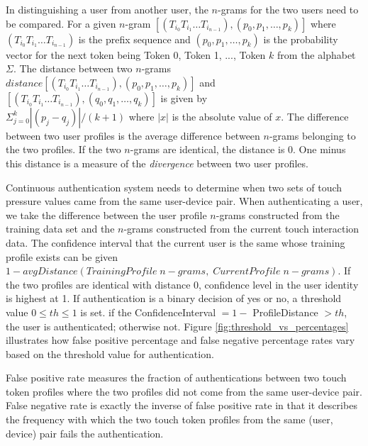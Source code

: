 \documentclass{acm_proc_article-sp}
\begin{document}
In distinguishing a user from another user, the $n$-grams for the two users need to be compared. 
For a given $n$-gram $[(T_{i_0} T_{i_1} \dots T_{i_{n-1}}), (p_0, p_1, \dots, p_k)]$ where 
$(T_{i_0} T_{i_1} \dots T_{i_{n-1}})$ is the prefix sequence and $(p_0, p_1, \dots, p_k)$ is the
probability vector for the next token being Token 0, Token 1, ..., Token $k$ from the alphabet $\Sigma$.
The distance between two $n$-grams $distance[(T_{i_0} T_{i_1} \dots T_{i_{n-1}}), (p_0, p_1, \dots, p_k)]$
and \\
$[(T_{i_0} T_{i_1} \dots T_{i_{n-1}}), (q_0, q_1, \dots, q_k)]$ is
given by \\
$\Sigma_{j=0}^k|(p_j - q_j)|/(k+1)$ where $|x|$ is the absolute value of $x$.
The difference between two user profiles is the average difference between $n$-grams belonging
to the two profiles. If the two $n$-grams are identical, the distance is 0.
One minus this distance is a measure of the {\it divergence} between two user profiles.

Continuous authentication system needs to determine when two sets of touch pressure values came from the same user-device pair. When authenticating a user, we take the difference between
the user profile $n$-grams constructed from the training data set and the $n$-grams
constructed from the current touch interaction data. The confidence interval
that the current user is the same whose training profile exists can be given $1 - 
avgDistance(TrainingProfile \; n-grams, \; CurrentProfile \; n-grams)$. If the two profiles are
identical with distance 0, confidence level in the user identity is highest at 1.
%
If authentication is a binary decision of yes or no, a threshold value $0 \leq th \leq 1$ is set.
if the ConfidenceInterval $= 1 -$ ProfileDistance $> th$, the user is authenticated; otherwise not. 
Figure \ref{fig:threshold_vs_percentages} illustrates how false positive percentage and false negative percentage rates vary based on the threshold value for authentication. 


False positive rate measures the fraction of authentications between two touch token profiles where 
the two profiles did not come from the same user-device pair.
False negative rate is exactly the inverse of false positive rate in that it describes the
frequency with which the two touch token profiles from the same (user, device) pair fails the authentication. 
\end{document}
